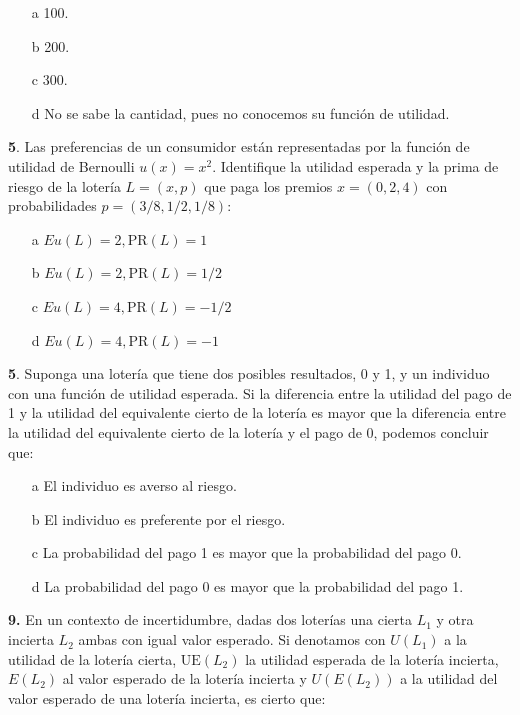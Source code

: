 \documentclass{nuevotema}
\begin{document}
\begin{enumerate}
	\item[a] 100.
	\item[b] 200.
	\item[c] 300.
	\item[d] No se sabe la cantidad, pues no conocemos su función de utilidad.
\end{enumerate}


\textbf{5}. Las preferencias de un consumidor están representadas por la función de utilidad de Bernoulli $u(x) = x^2$. Identifique la utilidad esperada y la prima de riesgo de la lotería $L=(x,p)$ que paga los premios $x=(0, 2, 4)$ con probabilidades $p = (3/8, 1/2, 1/8)$:

\begin{enumerate}
	\item[a] $Eu(L) = 2, \text{PR}(L) = 1$
	\item[b] $Eu(L) = 2, \text{PR}(L) = 1/2$
	\item[c] $Eu(L) = 4, \text{PR}(L) = -1/2$
	\item[d] $Eu(L) = 4, \text{PR}(L) = -1$
\end{enumerate}


\textbf{5}. Suponga una lotería que tiene dos posibles resultados, 0 y 1, y un individuo con una función de utilidad esperada. Si la diferencia entre la utilidad del pago de 1 y la utilidad del equivalente cierto de la lotería es mayor que la diferencia entre la utilidad del equivalente cierto de la lotería y el pago de 0, podemos concluir que:
\begin{enumerate}
	\item[a] El individuo es averso al riesgo.
	\item[b] El individuo es preferente por el riesgo.
	\item[c] La probabilidad del pago 1 es mayor que la probabilidad del pago 0.
	\item[d] La probabilidad del pago 0 es mayor que la probabilidad del pago 1.
\end{enumerate}


\textbf{9.} En un contexto de incertidumbre, dadas dos loterías una cierta $L_1$ y otra incierta $L_2$ ambas con igual valor esperado. Si denotamos con $U(L_1)$ a la utilidad de la lotería cierta, $\text{UE}(L_2)$ la utilidad esperada de la lotería incierta, $E(L_2)$ al valor esperado de la lotería incierta y $U(E(L_2))$ a la utilidad del valor esperado de una lotería incierta, es cierto que:
\end{document}
